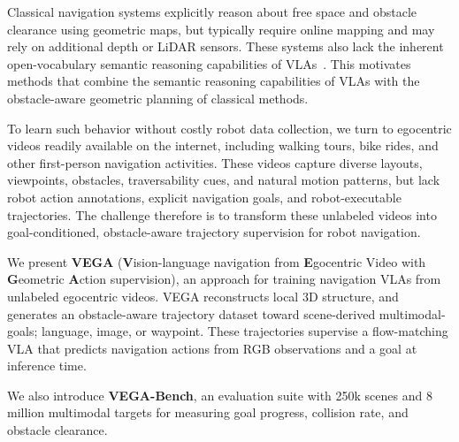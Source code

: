 Classical navigation systems explicitly reason about free space and obstacle clearance using geometric maps, but typically require online mapping and may rely on additional depth or LiDAR sensors. These systems also lack the inherent open-vocabulary semantic reasoning capabilities of VLAs~\cite{werby2024hierarchical,inglin2026less}.
This motivates methods that combine the semantic reasoning capabilities of VLAs with the obstacle-aware geometric planning of classical methods.

To learn such behavior without costly robot data collection, we turn to egocentric videos readily available on the internet, including walking tours, bike rides, and other first-person navigation activities.
These videos capture diverse layouts, viewpoints, obstacles, traversability cues, and natural motion patterns, but lack robot action annotations, explicit navigation goals, and robot-executable trajectories.
The challenge therefore is to transform these unlabeled videos into goal-conditioned, obstacle-aware trajectory supervision for robot navigation.

We present \textbf{VEGA} (\textbf{V}ision-language navigation from \textbf{E}gocentric Video with \textbf{G}eometric \textbf{A}ction supervision), an approach for training navigation VLAs from unlabeled egocentric videos. 
VEGA reconstructs local 3D structure, and generates an obstacle-aware trajectory dataset toward scene-derived multimodal-goals; language, image, or waypoint. 
These trajectories supervise a flow-matching VLA that predicts navigation actions from RGB observations and a goal at inference time.

We also introduce \textbf{VEGA-Bench}, an evaluation suite with 250k scenes and 8 million multimodal targets for measuring goal progress, collision rate, and obstacle clearance. 


